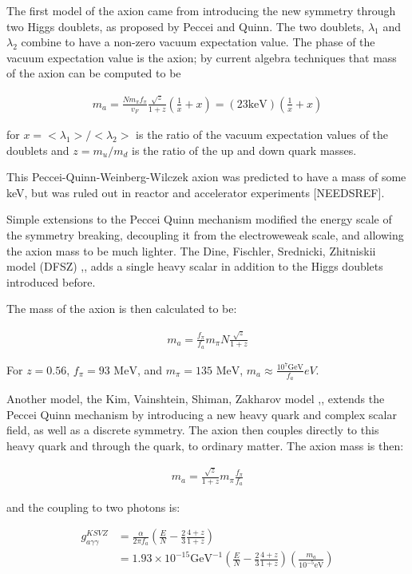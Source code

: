 \documentclass[12pt,twosides]{book}
\begin{document}
The first model of the axion came from introducing the new symmetry through two Higgs doublets, as proposed by Peccei and Quinn. The two doublets, $\lambda_1$ and $\lambda_2$ combine to have a non-zero vacuum expectation value. The phase of the vacuum expectation value is the axion; by current algebra techniques that mass of the axion can be computed to be 

\begin{align*}
m_a = \frac{Nm_\pi f_\pi}{v_F}\frac{\sqrt{z}}{1+z}(\frac{1}{x}+x) = (23 \text{keV})(\frac{1}{x}+x)
\end{align*}

for $ x = <\lambda_1>/<\lambda_2>$ is the ratio of the vacuum expectation values of the doublets and $z = m_u/m_d$ is the ratio of the up and down quark masses.

This Peccei-Quinn-Weinberg-Wilczek axion was predicted to have a mass of some keV, but was ruled out in reactor and accelerator experiments \cite{crystalball90} [NEEDSREF].

Simple extensions to the Peccei Quinn mechanism modified the energy scale of the symmetry breaking, decoupling it from the electroweweak scale, and allowing the axion mass to be much lighter. The Dine, Fischler, Srednicki, Zhitniskii model (DFSZ) \cite{dine81},\cite{zhitniskii81}, adds a single heavy scalar in addition to the Higgs doublets introduced before. 

The mass of the axion is then calculated to be:

\begin{align*}
m_a = \frac{f_\pi}{f_a} m_\pi N \frac{\sqrt{z}}{1+z}
\end{align*}

For $z= 0.56$, $f_\pi = 93 \text{ MeV}$, and $m_\pi = 135\text{ MeV}$, $m_a \approx \frac{10^7\text{GeV}}{f_a}eV$.

Another model, the Kim, Vainshtein, Shiman, Zakharov model \cite{kim79},\cite{shifman80}, extends the Peccei Quinn mechanism by introducing a new heavy quark and complex scalar field, as well as a discrete symmetry. The axion then couples directly to this heavy quark and through the quark, to ordinary matter. The axion mass is then:

\begin{align*}
m_a = \frac{\sqrt{z}}{1+z}m_\pi\frac{f_\pi}{f_a}
\end{align*}

and the coupling to two photons is:

\begin{align*}
g_{a\gamma\gamma}^{KSVZ} &= \frac{\alpha}{2\pi f_a}(\frac{E}{N}-\frac{2}{3}\frac{4+z}{1+z}) 
\\ &= 1.93\times10^{-15}\text{GeV}^{-1}(\frac{E}{N}-\frac{2}{3}\frac{4+z}{1+z})(\frac{m_a}{10^{-5}\text{eV}})
\end{align*}
\end{document}
